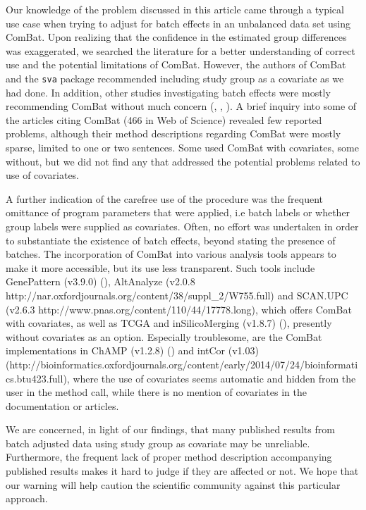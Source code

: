 \documentclass[oupdraft]{bio}
\begin{document}
Our knowledge of the problem discussed in this article came through a typical use case when trying to adjust for batch effects in an unbalanced data set using ComBat. Upon realizing that the confidence in the estimated group differences was exaggerated, we searched the literature for a better understanding of correct use and the potential limitations of ComBat. However, the authors of ComBat and the \texttt{sva} package recommended including study group as a covariate as we had done. In addition, other studies investigating batch effects were mostly recommending ComBat without much concern (\citealp{Kupfer2012}, \citealp{Kitchen2011}, \citealp{Chen2011}). A brief inquiry into some of the articles citing ComBat (466 in Web of Science) revealed few reported problems, although their method descriptions regarding ComBat were mostly sparse, limited to one or two sentences. Some used ComBat with covariates, some without, but we did not find any that addressed the potential problems related to use of covariates.

A further indication of the carefree use of the procedure was the frequent omittance of program parameters that were applied, i.e batch labels or whether group labels were supplied as covariates. Often, no effort was undertaken in order to substantiate the existence of batch effects, beyond stating the presence of batches. The incorporation of ComBat into various analysis tools appears to make it more accessible, but its use less transparent. Such tools include GenePattern (v3.9.0) (\citealp{Reich2006}), AltAnalyze (v2.0.8 http://nar.oxfordjournals.org/content/38/suppl_2/W755.full) and SCAN.UPC (v2.6.3 http://www.pnas.org/content/110/44/17778.long), which offers ComBat with covariates, as well as TCGA and  inSilicoMerging (v1.8.7) (\citealp{ http://www.biomedcentral.com/1471-2105/13/335}), presently without covariates as an option. Especially troublesome, are the ComBat implementations in ChAMP (v1.2.8) (\citealp{http://bioinformatics.oxfordjournals.org/content/30/3/428.full}) and intCor (v1.03) (http://bioinformatics.oxfordjournals.org/content/early/2014/07/24/bioinformatics.btu423.full), where the use of covariates seems automatic and hidden from the user in the method call, while there is no mention of covariates in the documentation or articles.


We are concerned, in light of our findings, that many published results from batch adjusted data using study group as covariate may be unreliable. Furthermore, the frequent lack of proper method description accompanying published results makes it hard to judge if they are affected or not. We hope that our warning will help caution the scientific community against this particular approach.
\end{document}
